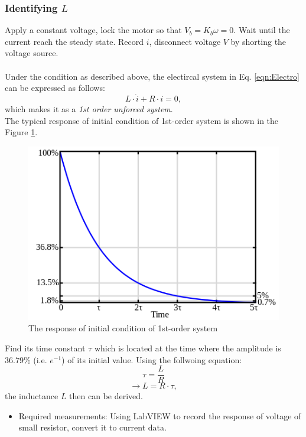\documentclass{article}
\begin{document}
\subsubsection{Identifying $L$}
Apply a constant voltage, lock the motor so that $V_b=K_b\omega=0$. Wait until the current reach the steady state. Record $i$, disconnect voltage $V$ by shorting the voltage source.\\ \\
Under the condition as described above, the electircal system in Eq. \eqref{eqn:Electro} can be expressed as follows:
\[L\cdot \dot{i}+R\cdot i=0,\]
which makes it as a \emph{1st order unforced system}.\\
The typical response of initial condition of 1st-order system is shown in the Figure \ref{fig:RCV}.\\

\begin{figure}[h!]
\centering
\includegraphics[scale=0.6]{RC_voltage.png}
\caption{The response of initial condition of 1st-order system}
\label{fig:RCV}
\end{figure}
\raggedright Find its time constant $\tau$ which is located at the time where the amplitude is $36.79\%$ (i.e. $e^{-1}$) of its initial value. Using the follwoing equation:
\[\tau=\frac{L}{R}\]
\[\rightarrow L=R\cdot\tau,\]
the inductance $L$ then can be derived.
\begin{itemize}
\item Required measurements: Using LabVIEW to record the response of voltage of small resistor, convert it to current data.
\end{itemize}
\end{document}
